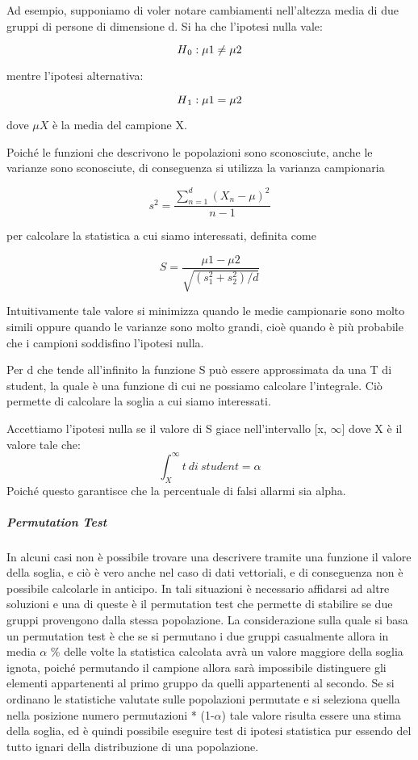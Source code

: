 Ad esempio, supponiamo di voler notare cambiamenti nell'altezza media di due gruppi di persone di dimensione d. Si ha che l'ipotesi nulla vale:

$$ H\textsubscript{0}: \mu 1 \neq \mu 2 $$

mentre l'ipotesi alternativa:

$$ H\textsubscript{1}: \mu 1 = \mu 2 $$

dove $\mu X$ è la media del campione X.

Poiché le funzioni che descrivono le popolazioni sono sconosciute, anche le varianze sono sconosciute, di conseguenza si utilizza la varianza campionaria

$$ s^2 = {\frac{\sum_{n=1}^{d} (X_n - \mu)^2}{n-1}} $$

per calcolare la statistica a cui siamo interessati, definita come

$$ S = \frac{\mu 1 - \mu 2}{\sqrt{(s^2_1 + s^2_2) / d}} $$

Intuitivamente tale valore si minimizza quando le medie campionarie sono molto simili oppure quando le varianze sono molto grandi, cioè quando è più probabile che i campioni soddisfino l'ipotesi nulla.

Per d che tende all'infinito la funzione S può essere approssimata da una T di student, la quale è una funzione di cui ne possiamo calcolare l'integrale. Ciò permette di calcolare la soglia a cui siamo interessati.

Accettiamo l'ipotesi nulla se il valore di S giace nell'intervallo [x, $\infty$] dove X è il valore tale che:
$$ \int_{X}^{\infty} t\ di\ student = \alpha $$
Poiché questo garantisce che la percentuale di falsi allarmi sia alpha.



\subparagraph{Permutation Test}
In alcuni casi non è possibile trovare una descrivere tramite una funzione il valore della soglia, e ciò è vero anche nel caso di dati vettoriali, e di conseguenza non è possibile calcolarle in anticipo. In tali situazioni è necessario affidarsi ad altre soluzioni e una di queste è il permutation test che permette di stabilire se due gruppi provengono dalla stessa popolazione. La considerazione sulla quale si basa un permutation test è che se si permutano i due gruppi casualmente allora in media $\alpha$ \% delle volte la statistica calcolata avrà un valore maggiore della soglia ignota, poiché permutando il campione allora sarà impossibile distinguere gli elementi appartenenti al primo gruppo da quelli appartenenti al secondo. 
Se si ordinano le statistiche valutate sulle popolazioni permutate e si seleziona quella nella posizione numero permutazioni * (1-$\alpha$) tale valore risulta essere una stima della soglia, ed è quindi possibile eseguire test di ipotesi statistica pur essendo del tutto ignari della distribuzione di una popolazione.